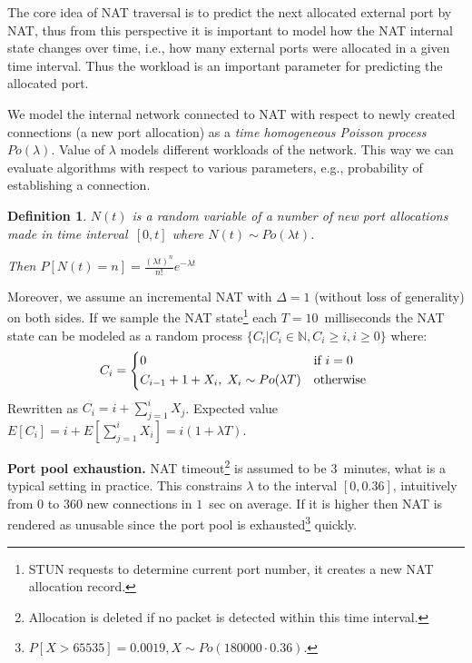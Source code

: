 \documentclass{acm_proc_article-sp}
\newtheorem{mydef}{Definition}
\begin{document}
The core idea of NAT traversal is to predict the next allocated external port by NAT, thus from this perspective 
it is important to model how the NAT internal state changes over time, i.e., how many external ports 
were allocated in a given time interval. Thus the workload is an important parameter for predicting the allocated port.

We model the internal network connected to NAT with respect to newly created connections (a new port allocation) as a 
\emph{time homogeneous Poisson process} $Po(\lambda)$. Value of $\lambda$ models
different workloads of the network. This way we can evaluate algorithms with respect to various parameters, e.g., 
probability of establishing a connection. 


\begin{mydef}
$N(t)$ is a random variable of a number of new port allocations made in time 
interval~$[0,t]$ where $N(t) \sim Po(\lambda t)$.
\begin{center}                                                     
Then $P[N(t)=n] = \frac{(\lambda t)^n}{n!} e^{-\lambda t}$
\end{center}
\end{mydef}

Moreover, we assume an incremental NAT with $\Delta=1$ (without loss of generality) on both sides. If we sample the NAT 
state\footnote{STUN requests to determine current port number, it creates a new NAT allocation record.}
each $T=10$~milliseconds the NAT state can be modeled as a random process $\{C_i | C_i \in \mathbb{N}, C_i \geq i, i\geq0\}$ where:
\[
C_i = \begin{dcases*}
         0 & if $i=0$ \\
         C_{i-1} + 1 + X_i, \; X_i \sim Po(\lambda T) & otherwise 
        \end{dcases*}
\]
Rewritten as $C_i = i + \sum_{j=1}^{i}X_j$. Expected value $E[C_i] = i + E[\sum_{j=1}^{i}X_i] = i (1+\lambda T)$.

\par\smallskip
\noindent\textbf{Port pool exhaustion.} NAT timeout\footnote{Allocation is deleted if no packet is detected within this time interval.} is assumed to be 3~minutes, 
what is a typical setting in practice. This constrains $\lambda$ to the interval $[0, 0.36]$, intuitively from $0$ to $360$ new connections in $1$~sec on average. 
If it is higher then NAT is rendered as unusable since the port pool is exhausted\footnote{$P[X > 65535] = 0.0019, X \sim Po(180000 \cdot 0.36)$.} quickly.
\end{document}
